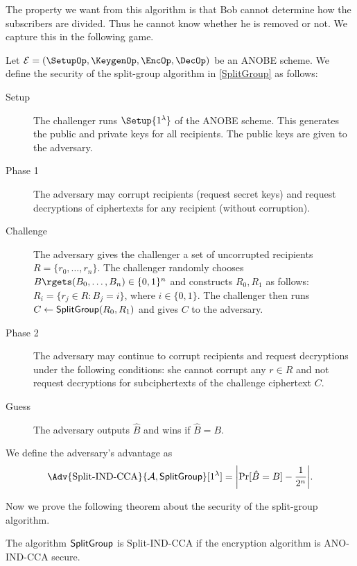 The property we want from this algorithm is that Bob cannot determine how the 
subscribers are divided.
Thus he cannot know whether he is removed or not.
We capture this in the following game.

\begin{definition}\label{SplitGroupSecurity}
  Let \(\mathcal{E} = (\SetupOp, \KeygenOp, \EncOp, \DecOp)\) be an \ac{ANOBE} 
  scheme.
  We define the security of the split-group algorithm in \cref{SplitGroup} as 
  follows:
  \begin{description}
    \item[Setup] The challenger runs \(\Setup{1^\lambda}\) of the \ac{ANOBE} 
      scheme.
      This generates the public and private keys for all recipients.
      The public keys are given to the adversary.

    \item[Phase 1] The adversary may corrupt recipients (request secret keys) 
      and request decryptions of ciphertexts for any recipient (without 
      corruption).

    \item[Challenge] The adversary gives the challenger a set of uncorrupted 
      recipients \(R = \{r_0, \ldots, r_n\}\).
      The challenger randomly chooses \(B\rgets (B_0, \ldots, B_n) \in \{0, 
        1\}^n\) and constructs \(R_0, R_1\) as follows:
      \(R_i = \{ r_j\in R\colon B_j = i\}\), where \(i\in \{0, 1\}\).
      The challenger then runs \(C\gets \SplitGroup[R_0, R_1]\) and gives \(C\) 
      to the adversary.

    \item[Phase 2] The adversary may continue to corrupt recipients and request 
      decryptions under the following conditions:
      she cannot corrupt any \(r\in R\) and not request decryptions for 
      subciphertexts of the challenge ciphertext \(C\).

    \item[Guess] The adversary outputs \(\hat{B}\) and wins if \(\hat{B} 
        = B\).
  \end{description}
  We define the adversary's advantage as \[\Adv{\text{Split-IND-CCA}}{\A, 
      \SplitGroupOp}[1^\lambda] = \mleft|\Pr[ \hat{B} 
    = B ] - \frac{1}{2^n}\mright|.\]
\end{definition}

Now we prove the following theorem about the security of the split-group 
algorithm.

\begin{theorem}\label{SplitGroupIsSecure}
  The algorithm \(\operatorname{\mathsf{SplitGroup}}\) is Split-IND-CCA if the encryption algorithm 
  is ANO-IND-CCA secure.
\end{theorem}


